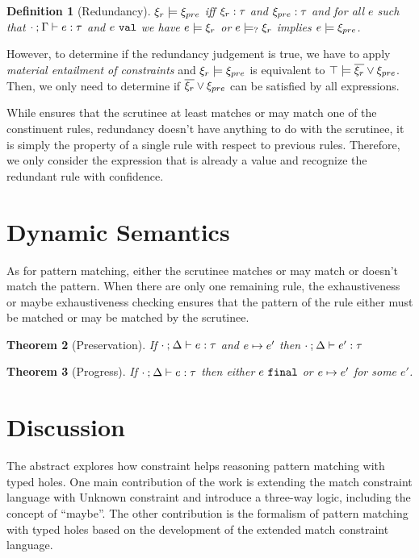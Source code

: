 \documentclass[acmsmall,screen,review,nonacm]{acmart}
\theoremstyle{slplain}
\newtheorem{thm}{Theorem}  %
\numberwithin{thm}{section}
\newtheorem{defn}[thm]{Definition}
\begin{document}
\begin{defn}[Redundancy]
  \label{defn:redundancy}
  $\xi_r \models \xi_{pre}$ iff $\xi_r : \tau$ and $\xi_{pre} : \tau$ and for all $e$ such that $\cdot \mathbin{;} \Gamma \vdash e : \tau$ and $e ~\mathtt{val}$ we have $e \models \xi_r$ or $e \models_{?} \xi_r$ implies $e \models \xi_{pre}$.
\end{defn}

However, to determine if the redundancy judgement is true, we have to apply \emph{material entailment of constraints} and $\xi_r \models \xi_{pre}$ is equivalent to $\top \models \overline{\xi_r} \vee \xi_{pre}$. Then, we only need to determine if $\overline{\xi_r} \vee \xi_{pre}$ can be satisfied by all expressions.

While  ensures that the scrutinee at least matches or may match one of the constinuent rules, redundancy doesn't have anything to do with the scrutinee, it is simply the property of a single rule with respect to previous rules. Therefore, we only consider the expression that is already a value and recognize the redundant rule with confidence.

\section{Dynamic Semantics}
\label{sec:dynamics}

As for pattern matching, either the scrutinee matches or may match or doesn't match the pattern.
When there are only one remaining rule, the exhaustiveness or maybe exhaustiveness checking ensures that the pattern of the rule either must be matched or may be matched by the scrutinee.

\begin{thm}[Preservation]
  \label{thrm:preservation}
  If $\cdot \mathbin{;} \Delta \vdash e : \tau$ and $e \mapsto e'$
  then $\cdot \mathbin{;} \Delta \vdash e' : \tau$
\end{thm}

\begin{thm}[Progress]
 \label{thrm:progress}
 If $\cdot \mathbin{;} \Delta \vdash e : \tau$ then either $e ~\mathtt{final}$ or $e \mapsto e'$ for some $e'$.
\end{thm}

\section{Discussion}
The abstract explores how constraint helps reasoning pattern matching with typed holes.
One main contribution of the work is extending the match constraint language \cite{Harper2012} with Unknown constraint and introduce a three-way logic, including the concept of ``maybe''. The other contribution is the formalism of pattern matching with typed holes based on the development of the extended match constraint language.
\end{document}
